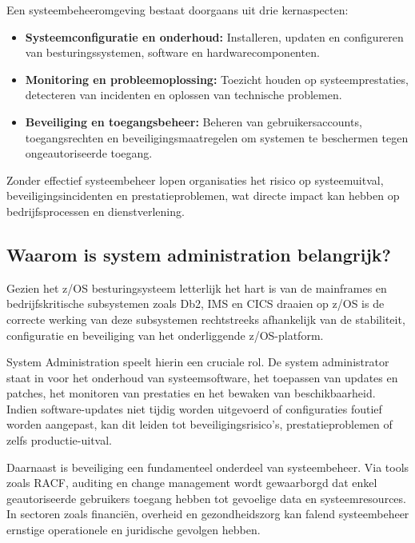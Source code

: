 Een systeembeheeromgeving bestaat doorgaans uit drie kernaspecten:
\begin{itemize}
	\item \textbf{Systeemconfiguratie en onderhoud:} Installeren, updaten en configureren van besturingssystemen, software en hardwarecomponenten.
	\item \textbf{Monitoring en probleemoplossing:} Toezicht houden op systeemprestaties, detecteren van incidenten en oplossen van technische problemen.
	\item \textbf{Beveiliging en toegangsbeheer:} Beheren van gebruikersaccounts, toegangsrechten en beveiligingsmaatregelen om systemen te beschermen tegen ongeautoriseerde toegang.
\end{itemize}

Zonder effectief systeembeheer lopen organisaties het risico op systeemuitval, beveiligingsincidenten en prestatieproblemen, wat directe impact kan hebben op bedrijfsprocessen en dienstverlening.

\subsection{Waarom is system administration belangrijk?}
\label{sec:waarom-sysbeheer-belang}

Gezien het z/OS besturingsysteem letterlijk het hart is van de mainframes en bedrijfskritische subsystemen zoals Db2, IMS en CICS draaien op z/OS is de correcte werking van deze subsystemen rechtstreeks afhankelijk van de stabiliteit, configuratie en beveiliging van het onderliggende z/OS-platform.

System Administration speelt hierin een cruciale rol. De system administrator staat in voor het onderhoud van systeemsoftware, het toepassen van updates en patches, het monitoren van prestaties en het bewaken van beschikbaarheid. Indien software-updates niet tijdig worden uitgevoerd of configuraties foutief worden aangepast, kan dit leiden tot beveiligingsrisico’s, prestatieproblemen of zelfs productie-uitval. \autocite{IBM_zOS_Concepts}

Daarnaast is beveiliging een fundamenteel onderdeel van systeembeheer. Via tools zoals RACF, auditing en change management wordt gewaarborgd dat enkel geautoriseerde gebruikers toegang hebben tot gevoelige data en systeemresources. In sectoren zoals financiën, overheid en gezondheidszorg kan falend systeembeheer ernstige operationele en juridische gevolgen hebben. \autocite{IBM_zOS_Concepts}

